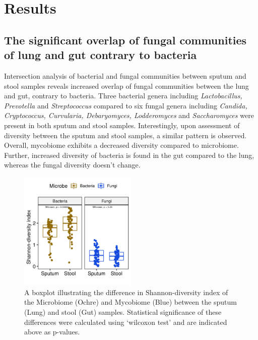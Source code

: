 \section{Results}

\subsection{The significant overlap of fungal communities of lung and gut contrary to bacteria}

Intersection analysis of bacterial and fungal communities between sputum and stool samples reveals increased overlap of fungal communities between the lung and gut, contrary to bacteria. Three bacterial genera including \emph{Lactobacillus, Prevotella} and \emph{Streptococcus} compared to six fungal genera including \emph{Candida, Cryptococcus, Curvularia, Debaryomyces, Lodderomyces} and \emph{Saccharomyces} were present in both sputum and stool samples. Interestingly, upon assessment of diversity between the sputum and stool samples, a similar pattern is observed. Overall, mycobiome exhibits a decreased diversity compared to microbiome. Further, increased diversity of bacteria is found in the gut compared to the lung, whereas the fungal diversity doesn't change. 

\begin{figure}[h]
	\centering
	\includegraphics[width=0.5\textwidth]{image/diversity.png}
	\caption{A boxplot illustrating the difference in Shannon-diversity index of the Microbiome (Ochre) and Mycobiome (Blue) between the sputum (Lung) and stool (Gut) samples. Statistical significance of these differences were calculated using `wilcoxon test' and are indicated above as p-values.}
	\label{res2_fig1}
\end{figure}

